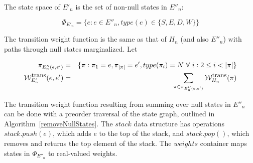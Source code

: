 \documentclass{article}
\newcommand\States{\Phi}
\newcommand\statesof[1]{\States_{#1}}
\newcommand\weight{{\cal W}}
\newcommand\weightfunof[1]{\weight_{#1}}
\newcommand\transweightfun[1]{\weightfunof{#1}^{\mbox{\small trans}}}
\begin{document}
The state space of $E'_n$ is the set of non-null states in $E''_n$:

\[
\statesof{E'_n} = \{ e : e \in E''_n, type(e) \in \{S,E,D,W\} \}
\]

The transition weight function is the same as that of $H_n$ (and also $E''_n$) with paths through null states marginalized.
Let 

\begin{eqnarray*}
\pi_{ {E''_n}(e,e')} &  =  & \{  \pi: \pi_1 =e, \pi_{|\pi|}=e', type(\pi_i) = N\ \forall\ i: 2 \leq i < |\pi| \} \\
 \transweightfun{E'_n}(e,e') & = & \sum_{\pi \in \pi_{E''_n(e,e') }} \transweightfun{H_n}(\pi) 
\end{eqnarray*}

The transition weight function resulting from summing over null states in $E''_n$ can be done with a preorder traversal of the state graph, outlined in Algorithm~\ref{removeNullStates}.   The $stack$ data structure has operations $stack.push(e)$, which adds $e$ to the top of the stack, and $stack.pop()$, which removes and returns the top element of the stack.  The $weights$ container maps states in $\statesof{E''_n}$ to real-valued weights.  
\end{document}

